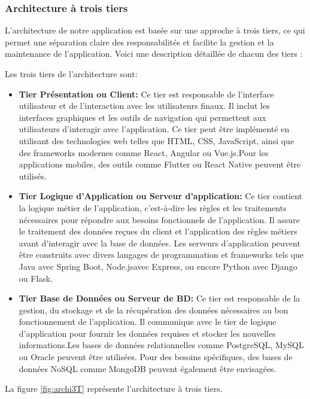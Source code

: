\documentclass[12pt]{report}
\begin{document}
			\subsubsection{Architecture à trois tiers}
	
			\hspace{15pt} L'architecture de notre application est basée sur une approche à trois tiers, ce qui permet une séparation claire des responsabilités et facilite la gestion et la maintenance de l'application. Voici une description détaillée de chacun des tiers :

			Les trois tiers de l'architecture sont:

			\begin{itemize}
				\item \textbf{Tier Présentation ou Client:} Ce tier est responsable de l'interface utilisateur et de l'interaction avec les utilisateurs finaux. Il inclut les interfaces graphiques et les outils de navigation qui permettent aux utilisateurs d'interagir avec l'application. Ce tier peut être implémenté en utilisant des technologies web telles que HTML, CSS, JavaScript, ainsi que des frameworks modernes comme React, Angular ou Vue.js.Pour les applications mobiles, des outils comme Flutter ou React Native peuvent être utilisés.
				\item \textbf{Tier Logique d'Application ou Serveur d'application:} Ce tier contient la logique métier de l'application, c'est-à-dire les règles et les traitements nécessaires pour répondre aux besoins fonctionnels de l'application. Il assure le traitement des données reçues du client et l'application des règles métiers avant d'interagir avec la base de données. Les serveurs d'application peuvent être construits avec divers langages de programmation et frameworks tels que Java avec Spring Boot, Node.jsavec Express, ou encore Python avec Django ou Flask.	
				\item \textbf{Tier Base de Données ou Serveur de BD:} Ce tier est responsable de la gestion, du stockage et de la récupération des données nécessaires au bon fonctionnement de l'application. Il communique avec le tier de logique d'application pour fournir les données requises et stocker les nouvelles informations.Les bases de données relationnelles comme PostgreSQL, MySQL ou Oracle peuvent être utilisées. Pour des besoins spécifiques, des bases de données NoSQL comme MongoDB peuvent également être envisagées.
			\end{itemize}

			La figure \ref{fig:archi3T} représente l’architecture à trois tiers.
			
\end{document}
